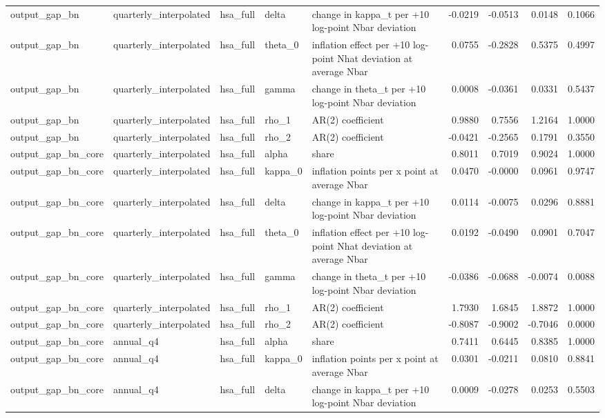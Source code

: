 \begin{tabular}{lllllrrrr}
output\_gap\_bn & quarterly\_interpolated & hsa\_full & delta & change in kappa\_t per +10 log-point Nbar deviation & -0.0219 & -0.0513 & 0.0148 & 0.1066 \\
output\_gap\_bn & quarterly\_interpolated & hsa\_full & theta\_0 & inflation effect per +10 log-point Nhat deviation at average Nbar & 0.0755 & -0.2828 & 0.5375 & 0.4997 \\
output\_gap\_bn & quarterly\_interpolated & hsa\_full & gamma & change in theta\_t per +10 log-point Nbar deviation & 0.0008 & -0.0361 & 0.0331 & 0.5437 \\
output\_gap\_bn & quarterly\_interpolated & hsa\_full & rho\_1 & AR(2) coefficient & 0.9880 & 0.7556 & 1.2164 & 1.0000 \\
output\_gap\_bn & quarterly\_interpolated & hsa\_full & rho\_2 & AR(2) coefficient & -0.0421 & -0.2565 & 0.1791 & 0.3550 \\
output\_gap\_bn\_core & quarterly\_interpolated & hsa\_full & alpha & share & 0.8011 & 0.7019 & 0.9024 & 1.0000 \\
output\_gap\_bn\_core & quarterly\_interpolated & hsa\_full & kappa\_0 & inflation points per x point at average Nbar & 0.0470 & -0.0000 & 0.0961 & 0.9747 \\
output\_gap\_bn\_core & quarterly\_interpolated & hsa\_full & delta & change in kappa\_t per +10 log-point Nbar deviation & 0.0114 & -0.0075 & 0.0296 & 0.8881 \\
output\_gap\_bn\_core & quarterly\_interpolated & hsa\_full & theta\_0 & inflation effect per +10 log-point Nhat deviation at average Nbar & 0.0192 & -0.0490 & 0.0901 & 0.7047 \\
output\_gap\_bn\_core & quarterly\_interpolated & hsa\_full & gamma & change in theta\_t per +10 log-point Nbar deviation & -0.0386 & -0.0688 & -0.0074 & 0.0088 \\
output\_gap\_bn\_core & quarterly\_interpolated & hsa\_full & rho\_1 & AR(2) coefficient & 1.7930 & 1.6845 & 1.8872 & 1.0000 \\
output\_gap\_bn\_core & quarterly\_interpolated & hsa\_full & rho\_2 & AR(2) coefficient & -0.8087 & -0.9002 & -0.7046 & 0.0000 \\
output\_gap\_bn\_core & annual\_q4 & hsa\_full & alpha & share & 0.7411 & 0.6445 & 0.8385 & 1.0000 \\
output\_gap\_bn\_core & annual\_q4 & hsa\_full & kappa\_0 & inflation points per x point at average Nbar & 0.0301 & -0.0211 & 0.0810 & 0.8841 \\
output\_gap\_bn\_core & annual\_q4 & hsa\_full & delta & change in kappa\_t per +10 log-point Nbar deviation & 0.0009 & -0.0278 & 0.0253 & 0.5503 \\

\end{tabular}
